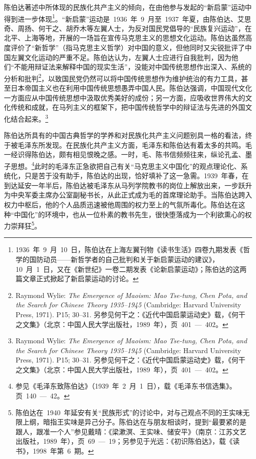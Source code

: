 陈伯达著述中所体现的民族化共产主义的倾向，在由他参与发起的“新启蒙”运动中得到进一步体现\footnote{1936~年~9~月~10~日，陈伯达在上海左翼刊物《读书生活》四卷九期发表《哲学的国防动员——新哲学者的自己批判和关于新启蒙运动的建议》，10~月~1~日，又在《新世纪》一卷二期发表《论新启蒙运动》；陈伯达的这两篇文章正式掀起了新启蒙运动的讨论。}。“新启蒙”运动是~1936~年~9~月至~1937~年夏，由陈伯达、艾思奇、周扬、何干之、胡乔木等左翼人士，为反对国民党倡导的“民族复兴运动”，在北平、上海等地，开展的一场旨在宣传马克思主义的思想文化运动。陈伯达虽然高度评价了“新哲学”（指马克思主义哲学）对中国的意义，但他同时又尖锐批评了中国左翼文化运动的严重不足。陈伯达认为，左翼人士应进行自我批判，因为他们“不能用辩证法来解释中国的现实生活”，没能对中国传统思想作出深入、系统的分析和批判\footnote{Raymond Wylie: \textit{The Emergence of Maoism: Mao Tse-tung, Chen Pota, and the Search for Chinese Theory 1935--1945} (Cambridge: Harvard University Press, 1971). P15; 30--31. 另参见何干之：《近代中国启蒙运动史》载，《何干之文集》（北京：中国人民大学出版社，1989~年），页~401~—~402。}，以致国民党仍然可以将中国传统思想作为维护统治的有力工具，甚至日本帝国主义也在利用中国传统思想愚弄中国人民。陈伯达强调，中国现代文化一方面应从中国传统思想中汲取优秀美好的成份；另一方面，应吸收世界伟大的文化传统和成就，在马列主义的框架下，把中国传统哲学中的辩证法与先进的外国文化结合起来。\footnote{Raymond Wylie: \textit{The Emergence of Maoism: Mao Tse-tung, Chen Pota, and the Search for Chinese Theory 1935--1945} (Cambridge: Harvard University Press, 1971). P15; 30--31. 另参见何干之：《近代中国启蒙运动史》载，《何干之文集》（北京：中国人民大学出版社，1989~年），页~401~—~402。}

陈伯达所具有的中国古典哲学的学养和对民族化共产主义问题别具一格的看法，终于被毛泽东所发现。在民族化共产主义方面，毛泽东和陈伯达有着太多的共鸣。毛一经识得陈伯达，颇有相见恨晚之感。一时，毛、陈书信频频往来，纵论孔孟、墨子思想。\footnote{参见《毛泽东致陈伯达》（1939~年~2~月~1~日），载《毛泽东书信选集》。页~140~—~42。}此时的毛泽东正急欲把自己有关“马克思主义中国化”的观点理论化、系统化，只是苦于没有助手，陈伯达的出现，恰好填补了这一急需。1939~年春，在到达延安一年半后，陈伯达被毛泽东从马列学院教书的岗位上解放出来，一步跃升为中央军委主席办公室副秘书长，从此正式成为毛的首席理论助手。当陈伯达跨入权力中枢后，他的个人品质迅速被他周围的权力至上的气氛所毒化。陈伯达在这种“中国化”的环境中，也从一位朴素的教书先生，很快堕落成为一个利欲熏心的权力崇拜狂\footnote{陈伯达在~1940~年延安有关“民族形式”的讨论中，对与己观点不同的王实味无限上纲，暗指王实味是异己分子。陈伯达在与朋友相谈时，提到“最要紧的是跟人，跟准一个人”参见戴晴：《梁漱溟、王实味、储安平》（南京：江苏文艺出版社，1989~年），页~69~—~19；另参见于光远：《初识陈伯达》，载《读书》，1998~年第~6~期。}。

